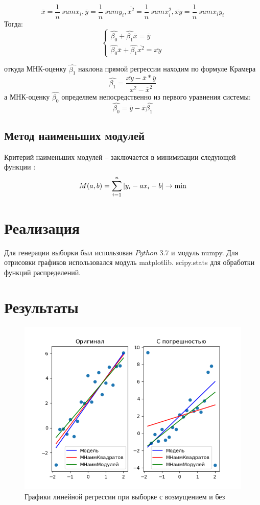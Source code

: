 \documentclass[a4]{article}
\begin{document}
			$$\overline{x} = \frac{1}{n} \ sum x_i, \overline{y} = \frac{1}{n} \ sum y_i, \overline{x^2} = \frac{1}{n} \ sum x^2_i, \overline{xy} = \frac{1}{n} \ sum x_iy_i$$
			Тогда:
			\begin{equation*} 
			\begin{cases}
			\hat{\beta_0} + \hat{\beta_1}\overline{x} = \overline{y}\\
			\hat{\beta_0}\overline{x} + \hat{\beta_1} \overline{x^2} = \overline{xy}
			\end{cases}
			\end{equation*}
			
			откуда МНК-оценку $\hat{\beta_1}$ наклона прямой регрессии находим по формуле
			Крамера
			$$\hat{\beta_1} = \frac{\overline{xy} - \overline{x} * \overline{y}}{\overline{x^2} - {\overline{x}}^2}$$
			а МНК-оценку $\hat{\beta_0}$ определяем непосредственно из первого уравнения системы:
			$$\hat{\beta_0} = \overline{y} - \overline{x}\hat{\beta_1}$$
			
			\subsection{Метод наименьших модулей}
			Критерий наименьших модулей – заключается в минимизации следующей функции \cite{6_4}:
			\begin{equation}
			M(a,b) = \sum\limits_{i=1}^n\vert y_i-ax_i-b\vert\to\min\hfill
			\end{equation}			
			
	\section{Реализация}
	Для генерации выборки был использован $Python\;3.7$ и модуль numpy. Для отрисовки графиков использовался модуль matplotlib. scipy.stats для обработки функций распределений.
	\newpage
	\section{Результаты}
		\begin{figure}[h!]
			\includegraphics[width=\textwidth]{Graph.png} 
			\caption[Графики линейной регрессии при выборке с возмущением и без]{Графики линейной регрессии при выборке с возмущением и без}
		\end{figure}
		
\end{document}

